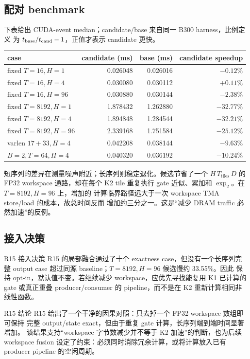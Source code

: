 \subsection{配对 benchmark}

下表给出 CUDA-event median；candidate/base 来自同一 B300 harness，比例定义
为 \(t_{\rm base}/t_{\rm cand}-1\)，正值才表示 candidate 更快。

\begin{center}
\small
\begin{tabular}{@{}l r r r@{}}
\toprule
case & candidate (ms) & base (ms) & candidate speedup \\
\midrule
fixed $T=16,H=1$   & 0.026048 & 0.026016 & $-0.12\%$ \\
fixed $T=16,H=4$   & 0.030080 & 0.030112 & $+0.11\%$ \\
fixed $T=16,H=96$  & 0.030880 & 0.030144 & $-2.38\%$ \\
fixed $T=8192,H=1$  & 1.878432 & 1.262880 & $-32.77\%$ \\
fixed $T=8192,H=4$  & 1.894848 & 1.284544 & $-32.21\%$ \\
fixed $T=8192,H=96$ & 2.339168 & 1.751584 & $-25.12\%$ \\
varlen $17+33,H=4$ & 0.042208 & 0.038144 & $-9.63\%$ \\
$B=2,T=64,H=4$   & 0.040320 & 0.036192 & $-10.24\%$ \\
\bottomrule
\end{tabular}
\end{center}

短序列的差异在测量噪声附近；长序列则稳定退化。候选节省了一个
\(H\,T_{\mathrm{tiles}}\,D\) 的 FP32 workspace 通路，却在每个 K2 tile
重复执行 gate 近似、累加和 \(\exp_2\)。在 \(T=8192,H=96\) 上，增加的
计算临界路径远大于一次 workspace TMA store/load 的成本，故总时间反而
增加约三分之一。这是“减少 DRAM traffic 必然加速”的反例。

\subsection{接入决策}

\begin{decision}{R15 接入决策}
R15 的局部融合通过了十个 exactness case，但没有一个长序列完整 output
case 超过同源 baseline；\(T=8192,H=96\) 候选慢约 33.55\%。因此
 保持 opt-in，默认值不变。若继续减少
workspace，应优先寻找能复用 K1 已计算的 gate 或真正重叠 producer/consumer
的 pipeline，而不是在 K2 重新计算相同非线性函数。
\end{decision}

\begin{record}{R15 结论}
R15 给出了一个干净的因果对照：只去掉一个 FP32 workspace 数组即可保持
完整 output/state exact，但由于重复 gate 计算，长序列端到端时间显著增加。
该结果支持“workspace 字节数减少并不等于 K2 加速”的判断，也为后续
workspace fusion 设定了约束：必须同时消除冗余计算，或将计算放入已有
producer pipeline 的空闲周期。
\end{record}
